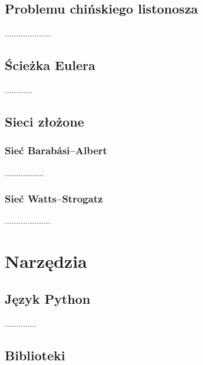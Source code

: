 \documentclass[a4paper, 12pt, twoside, openright]{article}
\begin{document}
\subsection{Problemu chińskiego listonosza}
	\indent\par
	....................

\subsection{Ścieżka Eulera}
\indent\par
............
\cite{mixedNetworksCPP}
\cite{MatchingEulertourAsCPP}

\subsection{Sieci złożone}
\subsubsection{Sieć Barabási–Albert}
\indent\par
.................
\subsubsection{Sieć Watts–Strogatz}
\indent\par
....................

\newpage
\section{Narzędzia}
\subsection{Język Python}
\indent\par
..............



\subsection{Biblioteki}
\indent\par
\end{document}
